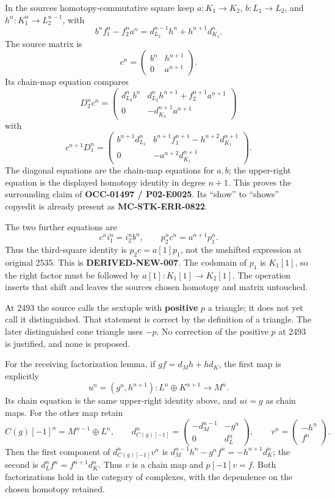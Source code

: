 In the source\textquotesingle s homotopy-commutative square keep \(a:K_1\to K_2\),\allowbreak{} \(b:L_1\to L_2\),\allowbreak{} and \(h^n:K_1^n\to L_2^{n-1}\),\allowbreak{} with \[
b^nf_1^n-f_2^na^n=d_{L_2}^{n-1}h^n+h^{n+1}d_{K_1}^n.
\] The source matrix is \[
c^n=\begin{pmatrix}b^n&h^{n+1}\\0&a^{n+1}\end{pmatrix}.
\] Its chain-map equation compares \[
D_2^nc^n=
\begin{pmatrix}
d_{L_2}^nb^n&d_{L_2}^nh^{n+1}+f_2^{n+1}a^{n+1}\\
0&-d_{K_2}^{n+1}a^{n+1}
\end{pmatrix}
\] with \[
c^{n+1}D_1^n=
\begin{pmatrix}
b^{n+1}d_{L_1}^n&b^{n+1}f_1^{n+1}-h^{n+2}d_{K_1}^{n+1}\\
0&-a^{n+2}d_{K_1}^{n+1}
\end{pmatrix}.
\] The diagonal equations are the chain-map equations for \(a,b\); the upper-right equation is the displayed homotopy identity in degree \(n+1\). This proves the surrounding claim of \textbf{OCC-01497 /\allowbreak{} P02-E0025}. Its ``show'' to ``shows'' copyedit is already present as \textbf{MC-STK-ERR-0822}.

The two further equations are \[
c^ni_1^n=i_2^nb^n,\qquad p_2^nc^n=a^{n+1}p_1^n.
\] Thus the third-square identity is \(p_2c=a[1]p_1\),\allowbreak{} not the unshifted expression at original 2535. This is \textbf{DERIVED-NEW-007}. The codomain of \(p_1\) is \(K_1[1]\),\allowbreak{} so the right factor must be followed by \(a[1]:K_1[1]\to K_2[1]\). The operation inserts that shift and leaves the source\textquotesingle s chosen homotopy and matrix untouched.

At 2493 the source calls the sextuple with \textbf{positive} \(p\) a triangle; it does not yet call it distinguished. That statement is correct by the definition of a triangle. The later distinguished cone triangle uses \(-p\). No correction of the positive \(p\) at 2493 is justified,\allowbreak{} and none is proposed.

For the receiving factorization lemma,\allowbreak{} if \(gf=d_Mh+hd_K\),\allowbreak{} the first map is explicitly \[
u^n=(g^n,h^{n+1}):L^n\oplus K^{n+1}\to M^n.
\] Its chain equation is the same upper-right identity above,\allowbreak{} and \(ui=g\) as chain maps. For the other map retain \[
C(g)[-1]^n=M^{n-1}\oplus L^n,\qquad
d_{C(g)[-1]}^n=
\begin{pmatrix}-d_M^{n-1}&-g^n\\0&d_L^n\end{pmatrix},\qquad
v^n=\begin{pmatrix}-h^n\\f^n\end{pmatrix}.
\] Then the first component of \(d_{C(g)[-1]}^nv^n\) is \(d_M^{n-1}h^n-g^nf^n=-h^{n+1}d_K^n\); the second is \(d_L^nf^n=f^{n+1}d_K^n\). Thus \(v\) is a chain map and \(p[-1]v=f\). Both factorizations hold in the category of complexes,\allowbreak{} with the dependence on the chosen homotopy retained.

